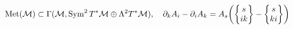 \documentclass[preview]{standalone}
\begin{document}
\begin{align*}
\special{dvisvgm:raw <g id='unique000'>}\operatorname{Met}(\mathcal{M}) \subset \Gamma(\mathcal{M}, \operatorname{Sym}^2 T^*\mathcal{M} \oplus \Lambda^2 T^*\mathcal{M}),\quad \partial_k A_i - \partial_i A_k = A_s\!\left(\begin{Bmatrix}s\\ik\end{Bmatrix} - \begin{Bmatrix}s\\ki\end{Bmatrix}\right)\special{dvisvgm:raw </g>}
\end{align*}
\end{document}

